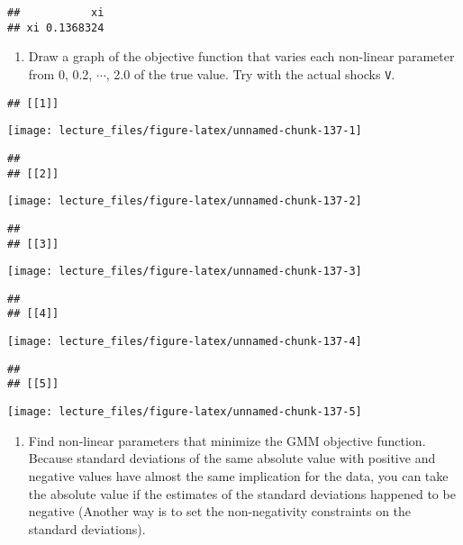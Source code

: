 \documentclass[
]{book}
\providecommand{\tightlist}{%
  \setlength{\itemsep}{0pt}\setlength{\parskip}{0pt}}
\begin{document}
\begin{verbatim}
##           xi
## xi 0.1368324
\end{verbatim}

\begin{enumerate}
\def\labelenumi{\arabic{enumi}.}
\setcounter{enumi}{11}
\tightlist
\item
  Draw a graph of the objective function that varies each non-linear parameter from 0, 0.2, \(\cdots\), 2.0 of the true value. Try with the actual shocks \texttt{V}.
\end{enumerate}

\begin{verbatim}
## [[1]]
\end{verbatim}

\begin{center}\texttt{[image: lecture\_files/figure-latex/unnamed-chunk-137-1]} \end{center}

\begin{verbatim}
## 
## [[2]]
\end{verbatim}

\begin{center}\texttt{[image: lecture\_files/figure-latex/unnamed-chunk-137-2]} \end{center}

\begin{verbatim}
## 
## [[3]]
\end{verbatim}

\begin{center}\texttt{[image: lecture\_files/figure-latex/unnamed-chunk-137-3]} \end{center}

\begin{verbatim}
## 
## [[4]]
\end{verbatim}

\begin{center}\texttt{[image: lecture\_files/figure-latex/unnamed-chunk-137-4]} \end{center}

\begin{verbatim}
## 
## [[5]]
\end{verbatim}

\begin{center}\texttt{[image: lecture\_files/figure-latex/unnamed-chunk-137-5]} \end{center}

\begin{enumerate}
\def\labelenumi{\arabic{enumi}.}
\setcounter{enumi}{12}
\tightlist
\item
  Find non-linear parameters that minimize the GMM objective function. Because standard deviations of the same absolute value with positive and negative values have almost the same implication for the data, you can take the absolute value if the estimates of the standard deviations happened to be negative (Another way is to set the non-negativity constraints on the standard deviations).
\end{enumerate}
\end{document}
